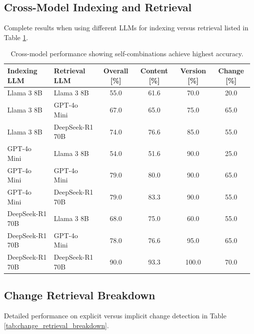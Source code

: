\subsection{Cross-Model Indexing and Retrieval}

Complete results when using different LLMs for indexing versus retrieval listed in Table \ref{tab:cross_model_performance}.

\begin{table}[hb]
\centering
\small
\caption{Cross-model performance showing self-combinations achieve highest accuracy.}
\begin{tabular}{llcccc}
\hline
Indexing LLM & Retrieval LLM & Overall [\%] & Content [\%] & Version [\%] & Change [\%] \\ \hline
Llama 3 8B & Llama 3 8B & 55.0 & 61.6 & 70.0 & 20.0 \\
Llama 3 8B & GPT-4o Mini & 67.0 & 65.0 & 75.0 & 65.0 \\
Llama 3 8B & DeepSeek-R1 70B & 74.0 & 76.6 & 85.0 & 55.0 \\ \hline
GPT-4o Mini & Llama 3 8B & 54.0 & 51.6 & 90.0 & 25.0 \\
GPT-4o Mini & GPT-4o Mini & 79.0 & 80.0 & 90.0 & 65.0 \\
GPT-4o Mini & DeepSeek-R1 70B & 79.0 & 83.3 & 90.0 & 55.0 \\ \hline
DeepSeek-R1 70B & Llama 3 8B & 68.0 & 75.0 & 60.0 & 55.0 \\
DeepSeek-R1 70B & GPT-4o Mini & 78.0 & 76.6 & 95.0 & 65.0 \\
DeepSeek-R1 70B & DeepSeek-R1 70B & 90.0 & 93.3 & 100.0 & 70.0 \\ \hline
\end{tabular}
\label{tab:cross_model_performance}
\end{table}

\newpage

\subsection{Change Retrieval Breakdown}

Detailed performance on explicit versus implicit change detection in Table \ref{tab:change_retrieval_breakdown}.

